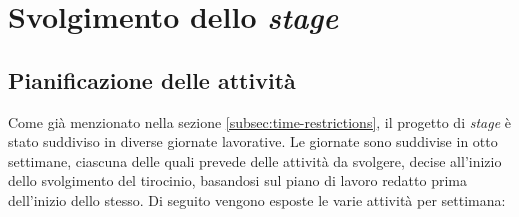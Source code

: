 \chapter{Svolgimento dello \textit{stage}}
\label{chap:svolgimento-stage}

\section{Pianificazione delle attività}\label{sec:activity-planning}\noindent
Come già menzionato nella sezione \ref{subsec:time-restrictions}, il progetto di \textit{stage} è stato suddiviso in diverse giornate lavorative.
Le giornate sono suddivise in otto settimane, ciascuna delle quali prevede delle attività da svolgere, decise all'inizio dello svolgimento del tirocinio, basandosi sul piano di lavoro redatto prima dell'inizio dello stesso.
Di seguito vengono esposte le varie attività per settimana:
